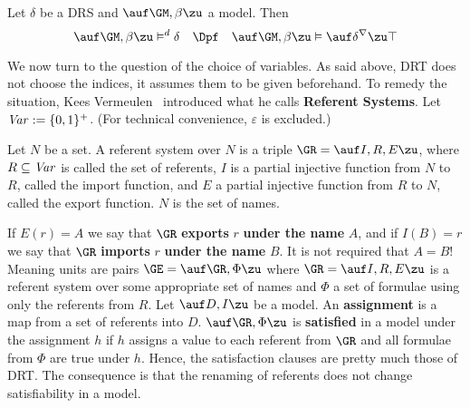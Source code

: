 \begin{thm}
Let $\delta$ be a DRS and $\auf \GM, \beta\zu$ a model.
Then
$$\auf \GM, \beta\zu\vDash^d \delta \quad\Dpf\quad
\auf \GM, \beta\zu \vDash \auf \delta^{\nabla}\zu \top$$
\end{thm}
We now turn to the question of the choice of variables. As said
above, DRT does not choose the indices, it assumes them to be
given beforehand. To remedy the situation, Kees
Vermeulen~ introduced what he calls
{\bf Referent Systems}. Let $\mbox{\it Var\/} := \{0,1\}^+$.
(For technical convenience, $\varepsilon$ is excluded.)
\begin{defn}
Let $N$ be a set. A referent system over $N$ is a triple
$\GR = \auf I, R, E\zu$, where $R \subseteq \mbox{\it Var\/}$ is
called the set of {\bmi referents}, $I$ is a partial injective
function from $N$ to $R$, called the {\bmi import function},
and $E$ a partial injective function from $R$ to $N$,
called the {\bmi export function}. $N$ is the set of
{\bmi names}.
\end{defn}
If $E(r) = A$ we say that $\GR$ {\bf exports} $r$ {\bf under
the name} $A$, and if $I(B) = r$ we say that $\GR$ {\bf imports}
$r$ {\bf under the name} $B$. It is not required that $A = B$!
Meaning units are pairs $\GE = \auf \GR,  \Phi\zu$ where $\GR =
\auf I, R, E\zu$ is a referent system over some appropriate
set of names and $\Phi$ a set of formulae using only the referents
from $R$. Let $\auf D, I\zu$ be a model. An {\bf assignment}
is a map from a set of referents into $D$. $\auf \GR, \Phi\zu$
is {\bf satisfied} in a model under the assignment $h$ if
$h$ assigns a value to each referent from $\GR$ and all formulae
from $\Phi$ are true under $h$. Hence, the satisfaction clauses
are pretty much those of DRT. The consequence is that the renaming
of referents does not change satisfiability in a model.

